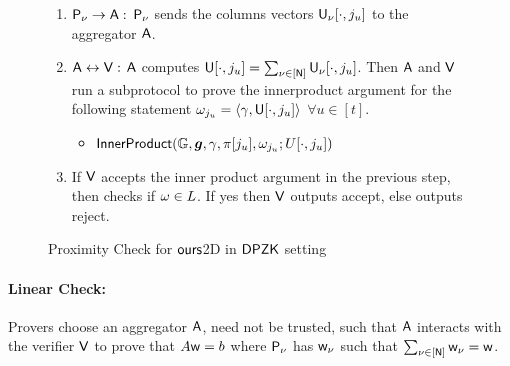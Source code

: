\begin{figure}[h!]
\begin{framed}
\begin{enumerate}
			\item $\mathsf{P}_{\nu} \rightarrow \mathsf{A} : $ $\mathsf{P}_{\nu}$ sends the columns vectors 
			$\mathsf{U}_{{\nu}}[\cdot,j_u]$ to the aggregator $\mathsf{A}$.
	
			\item $\mathsf{A} \leftrightarrow \mathsf{V} : $ $\mathsf{A}$ computes $\mathsf{U}[\cdot,j_u] = \sum_{\nu\in[\mathsf{N}]} \mathsf{U}_{{\nu}}[\cdot,j_u]$. Then $\mathsf{A}$ and $\mathsf{V}$ run a subprotocol to prove the innerproduct argument for the following statement $\omega_{j_u} = \langle \gamma,\mathsf{U}[\cdot, j_u]\rangle$ $\forall u\in[t]$.
			\begin{itemize}
				\item $\mathsf{InnerProduct}(\mathbb{G}, \bm{g}, \gamma, \pi[j_u], \omega_{j_u}; U[\cdot, j_u] )$
			\end{itemize}
	
			\item If $\mathsf{V}$ accepts the inner product argument in the previous step, then checks if $\omega\in L$. If yes then $\mathsf{V}$ outputs accept, else outputs reject.
		\end{enumerate}
	\end{framed}
\caption{Proximity Check for $\textsf{ours}$2D in $\mathsf{DPZK}$ setting}
\end{figure}

\paragraph{Linear Check: }
Provers choose an aggregator $\mathsf{A}$, need not be trusted, such that $\mathsf{A}$ interacts with the verifier $\mathsf{V}$ to prove that $A\mathsf{w}=b$ where $\mathsf{P}_{\nu}$ has $\mathsf{w}_{\nu}$ such that $\sum_{\nu\in[\mathsf{N}]} \mathsf{w}_{\nu}=\mathsf{w}$.
\begin{comment} 
Then each prover doess the following:
\begin{itemize}
	\item $\prover_{\nu}$ encodes $x_{\nu}$ in the same way mentioned in subsec:\ref{subsec:encode2D} and constructs encoded matrix $\ewit_{x_{\nu}}$.
	\item $\prover_{\nu}$ commits to $\ewit_{x_{\nu}}$ in the same way mentioned in subsec:\ref{subsec: commit2D} and constructs commitment vector $\comoracle_{\nu}$.
\end{itemize}
\end{comment}

